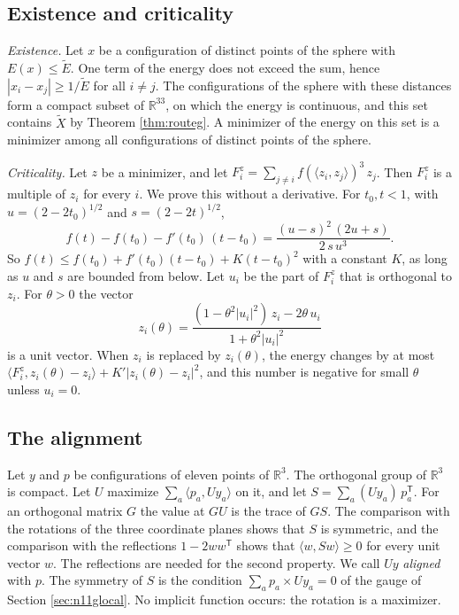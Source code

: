 \documentclass[reqno,a4paper,11pt]{amsart}
\numberwithin{equation}{section}
\def\R{{\mathbb R}}
\begin{document}
\subsection{Existence and criticality}

\emph{Existence.} Let $x$ be a configuration of distinct points of the sphere with $E(x) \leq \tilde E$. One term of the energy does not exceed the sum, hence $|x_i - x_j| \geq 1/\tilde E$ for all $i \neq j$. The configurations of the sphere with these distances form a compact subset of $\R^{33}$, on which the energy is continuous, and this set contains $\tilde X$ by Theorem \ref{thm:routeg}. A minimizer of the energy on this set is a minimizer among all configurations of distinct points of the sphere.

\emph{Criticality.} Let $z$ be a minimizer, and let $F^z_i = \sum_{j \neq i} f(\langle z_i, z_j \rangle)^3 \, z_j$. Then $F^z_i$ is a multiple of $z_i$ for every $i$. We prove this without a derivative. For $t_0, t < 1$, with $u = (2 - 2t_0)^{1/2}$ and $s = (2 - 2t)^{1/2}$,
$$
f(t) - f(t_0) - f'(t_0) \, (t - t_0) = \frac{(u - s)^2 \, (2u + s)}{2 \, s \, u^3} .
$$
So $f(t) \leq f(t_0) + f'(t_0)(t - t_0) + K (t - t_0)^2$ with a constant $K$, as long as $u$ and $s$ are bounded from below. Let $u_i$ be the part of $F^z_i$ that is orthogonal to $z_i$. For $\theta > 0$ the vector
$$
z_i(\theta) = \frac{(1 - \theta^2 |u_i|^2) \, z_i - 2 \theta \, u_i}{1 + \theta^2 |u_i|^2}
$$
is a unit vector. When $z_i$ is replaced by $z_i(\theta)$, the energy changes by at most $\langle F^z_i, z_i(\theta) - z_i \rangle + K' |z_i(\theta) - z_i|^2$, and this number is negative for small $\theta$ unless $u_i = 0$.

\subsection{The alignment}

Let $y$ and $p$ be configurations of eleven points of $\R^3$. The orthogonal group of $\R^3$ is compact. Let $U$ maximize $\sum_a \langle p_a, U y_a \rangle$ on it, and let $S = \sum_a (U y_a) \, p_a^{\mathsf T}$. For an orthogonal matrix $G$ the value at $G U$ is the trace of $G S$. The comparison with the rotations of the three coordinate planes shows that $S$ is symmetric, and the comparison with the reflections $1 - 2 w w^{\mathsf T}$ shows that $\langle w, S w \rangle \geq 0$ for every unit vector $w$. The reflections are needed for the second property. We call $U y$ \emph{aligned} with $p$. The symmetry of $S$ is the condition $\sum_a p_a \times U y_a = 0$ of the gauge of Section \ref{sec:n11glocal}. No implicit function occurs: the rotation is a maximizer.
\end{document}
